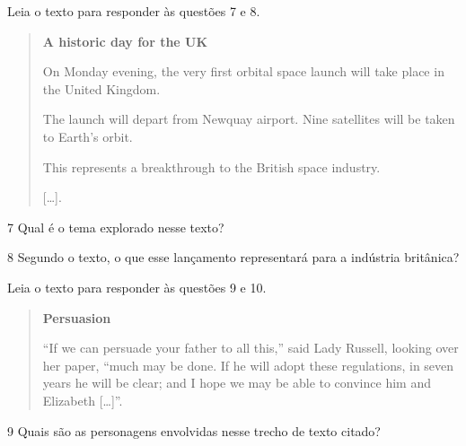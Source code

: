 
Leia o texto para responder às questões 7 e 8.

\begin{quote}
\textbf{A historic day for the UK}

On Monday evening, the very first orbital space launch will take place in the United Kingdom.

The launch will depart from Newquay airport. Nine satellites will be taken to Earth’s orbit.

This represents a breakthrough to the British space industry.

{[}\ldots{}{]}.

\end{quote}

\num{7} Qual é o tema explorado nesse texto?



\num{8} Segundo o texto, o que esse lançamento representará para a indústria britânica?



Leia o texto para responder às questões 9 e 10.

\begin{quote}
\textbf{Persuasion}

``If we can persuade your father to all this,'' said Lady Russell,
looking over her paper, ``much may be done. If he will adopt these
regulations, in seven years he will be clear; and I hope we may be able
to convince him and Elizabeth {[}\ldots{}{]}''.

\end{quote}

\num{9} Quais são as personagens envolvidas nesse trecho de texto citado?



